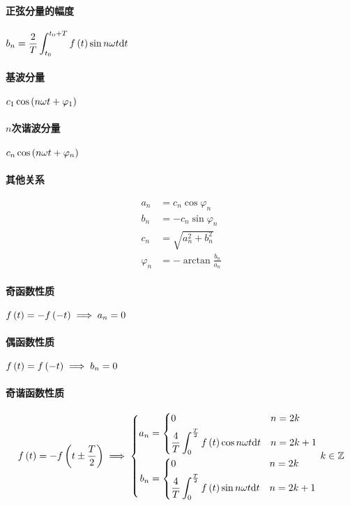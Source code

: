 \documentclass{article}
\begin{document}
\paragraph{正弦分量的幅度}$\displaystyle b_n=\frac2T\int_{t_0}^{t_0+T}f\left(t\right)\sin n\omega t\mathrm d t$

\paragraph{基波分量}$c_1\cos\left(n\omega t+\varphi_1\right)$

\paragraph{$n$次谐波分量}$c_n\cos\left(n\omega t+\varphi_n\right)$

\paragraph{其他关系}

\[\begin{aligned}
        a_n       & =c_n\cos\varphi_n        \\
        b_n       & =-c_n\sin\varphi_n       \\
        c_n       & =\sqrt{a_n^2+b_n^2}      \\
        \varphi_n & =-\arctan\frac{b_n}{a_n}
    \end{aligned}\]

\paragraph{奇函数性质}$f\left(t\right)=-f\left(-t\right)\implies a_n=0$

\paragraph{偶函数性质}$f\left(t\right)=f\left(-t\right)\implies b_n=0$

\paragraph{奇谐函数性质}

\[f\left(t\right)=-f\left(t\pm\frac T2\right)
    \implies\left\{\begin{aligned}
        a_n & =
        \left\{\begin{aligned}
                    & 0                                             &  & n=2k   \\
                    & \frac4T\int_0^{\frac T2}f\left(t\right)\cos n\omega t\mathrm d t &  & n=2k+1
               \end{aligned}\right. \\
        b_n & =
        \left\{\begin{aligned}
                    & 0                                             &  & n=2k   \\
                    & \frac4T\int_0^{\frac T2}f\left(t\right)\sin n\omega t\mathrm d t &  & n=2k+1
               \end{aligned}\right.
    \end{aligned}\right.k\in\mathbb Z\]
\end{document}
